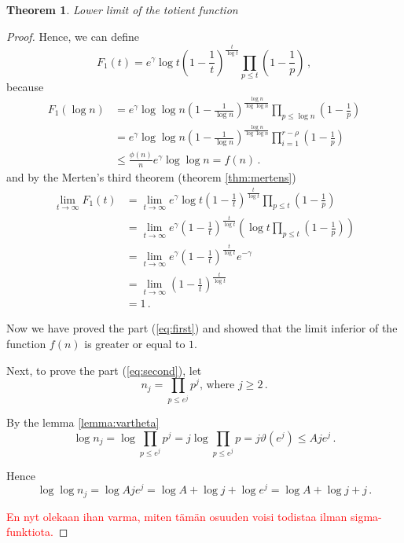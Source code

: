 \documentclass{article}
\theoremstyle{definition}
\newtheorem{theorem}[subsubsection]{Theorem}
\begin{document}
\begin{theorem}{\emph{Lower limit of the totient function}}
\begin{proof}
Hence, we can define
\begin{equation*}
    F_1(t)=e^\gamma \log t \left(1-\frac{1}{t}\right)^\frac{t}{\log t} \prod_{p\leq t} \left(1-\frac{1}{p}\right)\,,
\end{equation*}
because
\begin{align*}
    F_1(\log n) & = e^\gamma \log \log n \left(1-\frac{1}{\log n}\right)^\frac{\log n}{\log \log n} \prod_{p\leq \log n} \left(1-\frac{1}{p}\right)\\
    & = e^\gamma \log \log n \left(1-\frac{1}{\log n}\right)^\frac{\log n}{\log \log n} \prod_{i=1}^{r-\rho} \left(1-\frac{1}{p}\right)\\
    & \leq \frac{\phi(n)}{n} e^\gamma \log\log n = f(n)\,.
\end{align*}
and by the Merten's third theorem (theorem \ref{thm:mertens})
\begin{align*}
    \lim_{t \rightarrow \infty} F_1(t) & = \lim_{t \rightarrow \infty} e^\gamma \log t \left(1-\frac{1}{t}\right)^\frac{t}{\log t} \prod_{p\leq t} \left(1-\frac{1}{p}\right)\\
    & = \lim_{t \rightarrow \infty} e^\gamma \left( 1-\frac{1}{t}\right)^\frac{t}{\log t} \left(\log t \prod_{p\leq t} \left(1-\frac{1}{p}\right) \right)\\
    & = \lim_{t \rightarrow \infty} e^\gamma \left( 1-\frac{1}{t}\right)^\frac{t}{\log t} e^{-\gamma}\\
    & = \lim_{t \rightarrow \infty} \left( 1-\frac{1}{t}\right)^\frac{t}{\log t}\\
    & = 1\,.
\end{align*}

Now we have proved the part (\ref{eq:first}) and showed that the limit inferior of the function $f(n)$ is greater or equal to $1$.

Next, to prove the part (\ref{eq:second}), let
\begin{equation*}
    n_j=\prod_{p\leq e^j} p^j\text{, where } j\geq 2\,.
\end{equation*}

By the lemma \ref{lemma:vartheta}
\begin{equation*}
    \log n_j = \log \prod_{p\leq e^j} p^j = j \log \prod_{p\leq e^j} p = j\vartheta(e^j) \leq Aje^j\,.
\end{equation*}

Hence
\begin{equation*}
    \log \log n_j = \log Aje^j = \log A + \log j + \log e^j = \log A + \log j + j\,.
\end{equation*}

\textcolor{red}{En nyt olekaan ihan varma, miten tämän osuuden voisi todistaa ilman sigma-funktiota.}

\end{proof}

\end{theorem}
\end{document}
